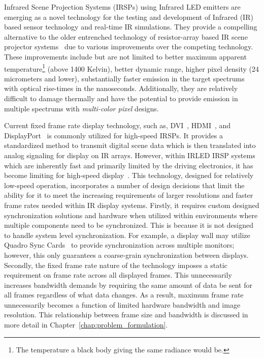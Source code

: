 \label{chap:introduction}

Infrared Scene Projection Systems (IRSPs) using Infrared LED emitters are emerging as a novel technology for the testing and development of Infrared (IR) based sensor technology and real-time IR simulations. They provide a compelling alternative to the older entrenched technology of resistor-array based IR scene projector systems~\cite{PritchardEtAl1998,WilliamsEtAl2005} due to various improvements over the competing technology. These improvements include but are not limited to better maximum apparent temperature\footnote{The temperature a black body giving the same radiance would be.} (above 1400 Kelvin), better dynamic range, higher pixel density (24 micrometers and lower), substantially faster emission in the target spectrums with optical rise-times in the nanoseconds. Additionally, they are relatively difficult to damage thermally and have the potential to provide emission in multiple spectrums with \emph{multi-color pixel} designs.

Current fixed frame rate display technology, such as, DVI~\cite{DDWG1999}, HDMI~\cite{HDMIForum2018}, and DisplayPort~\cite{BhowmikEtAl2012} is commonly utilized for high-speed IRSPs. It provides a standardized method to transmit digital scene data which is then translated into analog signaling for display on IR arrays. However, within IRLED IRSP systems which are inherently fast and primarily limited by the driving electronics, it has become limiting for high-speed display~\cite{LaVeignePrewarski2013}. This technology, designed for relatively low-speed operation, incorporates a number of design decisions that limit the ability for it to meet the increasing requirements of larger resolutions and faster frame rates needed within IR display systems. Firstly, it requires custom designed synchronization solutions and hardware when utilized within environments where multiple components need to be synchronized. This is because it is not designed to handle system level synchronization. For example, a display wall may utilize Quadro Sync Cards~\cite{NVIDIA2020_2} to provide synchronization across multiple monitors; however, this only guarantees a coarse-grain synchronization between displays. Secondly, the fixed frame rate nature of the technology imposes a static requirement on frame rate across all displayed frames. This unnecessarily increases bandwidth demands by requiring the same amount of data be sent for all frames regardless of what data changes. As a result, maximum frame rate unnecessarily becomes a function of limited hardware bandwidth and image resolution. This relationship between frame size and bandwidth is discussed in more detail in Chapter~\ref{chap:problem_formulation}.

